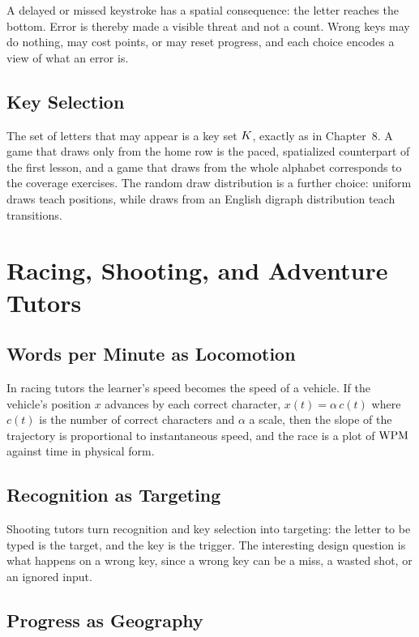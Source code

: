 A delayed or missed keystroke has a spatial consequence: the letter reaches the bottom. Error is thereby made a visible threat and not a count. Wrong keys may do nothing, may cost points, or may reset progress, and each choice encodes a view of what an error is. 

\section{Key Selection}

The set of letters that may appear is a key set $K$, exactly as in Chapter~8. A game that draws only from the home row is the paced, spatialized counterpart of the first lesson, and a game that draws from the whole alphabet corresponds to the coverage exercises. The random draw distribution is a further choice: uniform draws teach positions, while draws from an English digraph distribution teach transitions.

\chapter{Racing, Shooting, and Adventure Tutors}

\section{Words per Minute as Locomotion}

In racing tutors the learner's speed becomes the speed of a vehicle. If the vehicle's position $x$ advances by each correct character, $x(t)=\alpha\,c(t)$ where $c(t)$ is the number of correct characters and $\alpha$ a scale, then the slope of the trajectory is proportional to instantaneous speed, and the race is a plot of $\operatorname{WPM}$ against time in physical form.

\section{Recognition as Targeting}

Shooting tutors turn recognition and key selection into targeting: the letter to be typed is the target, and the key is the trigger. The interesting design question is what happens on a wrong key, since a wrong key can be a miss, a wasted shot, or an ignored input.

\section{Progress as Geography}

